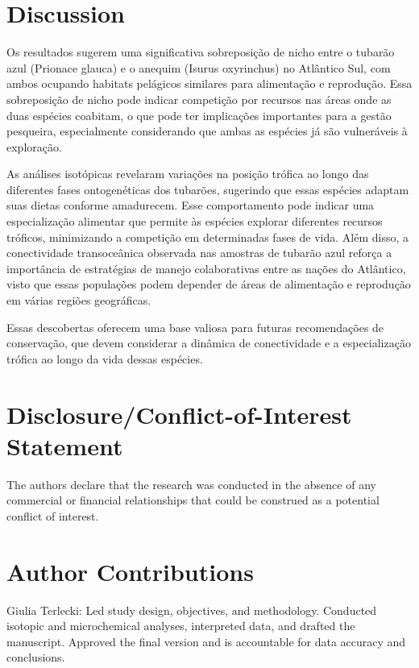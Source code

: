 \documentclass[utf8]{FrontiersinHarvard}
\begin{document}
\section{Discussion}\label{discussion}

Os resultados sugerem uma significativa sobreposição de nicho entre o
tubarão azul (Prionace glauca) e o anequim (Isurus oxyrinchus) no
Atlântico Sul, com ambos ocupando habitats pelágicos similares para
alimentação e reprodução. Essa sobreposição de nicho pode indicar
competição por recursos nas áreas onde as duas espécies coabitam, o que
pode ter implicações importantes para a gestão pesqueira, especialmente
considerando que ambas as espécies já são vulneráveis à exploração.

As análises isotópicas revelaram variações na posição trófica ao longo
das diferentes fases ontogenéticas dos tubarões, sugerindo que essas
espécies adaptam suas dietas conforme amadurecem. Esse comportamento
pode indicar uma especialização alimentar que permite às espécies
explorar diferentes recursos tróficos, minimizando a competição em
determinadas fases de vida. Além disso, a conectividade transoceânica
observada nas amostras de tubarão azul reforça a importância de
estratégias de manejo colaborativas entre as nações do Atlântico, visto
que essas populações podem depender de áreas de alimentação e reprodução
em várias regiões geográficas.

Essas descobertas oferecem uma base valiosa para futuras recomendações
de conservação, que devem considerar a dinâmica de conectividade e a
especialização trófica ao longo da vida dessas espécies.

\section*{Disclosure/Conflict-of-Interest
Statement}\label{disclosureconflict-of-interest-statement}

The authors declare that the research was conducted in the absence of
any commercial or financial relationships that could be construed as a
potential conflict of interest.

\section*{Author Contributions}\label{author-contributions}

Giulia Terlecki: Led study design, objectives, and methodology.
Conducted isotopic and microchemical analyses, interpreted data, and
drafted the manuscript. Approved the final version and is accountable
for data accuracy and conclusions.
\end{document}
